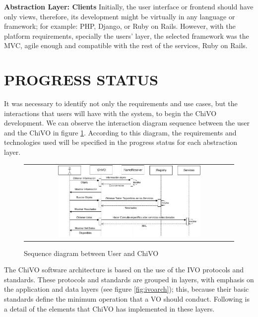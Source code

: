 \documentclass[]{spie}
\begin{document}
\textbf{Abstraction Layer:  Clients}
Initially, the user interface or frontend should have only views, therefore, its development might be virtually in any language or framework; for example: PHP, Django, or Ruby on Rails.  However, with the platform requirements, specially the users' layer, the selected framework was the MVC, agile enough and compatible with the rest of the services, Ruby on Rails.


\section{PROGRESS STATUS}
It was necessary to identify not only the requirements and use cases, but the interactions that users will have with the system, to begin the ChiVO development.  We can observe the interaction diagram sequence between the user and the ChiVO in figure \ref{fig:secuencia}.  According to this diagram, the requirements and technologies used will be specified in the progress status for each abstraction layer.

\begin{figure}
   \begin{center}
   \begin{tabular}{c}
   \includegraphics[width=0.7\textwidth]{images/secuencia.png}
   \end{tabular}
   \end{center}
   \caption[example]
   { \label{fig:secuencia} Sequence diagram between User and ChiVO}
\end{figure}

The ChiVO software architecture is based on the use of the IVO protocols and standards.  These protocols and standards are grouped in layers, with emphasis on the application and data layers (see figure \ref{fig:ivoarch}); this, because their basic standards define the minimum operation that a VO should conduct.  Following is a detail of the elements that ChiVO has implemented in these layers.
\end{document}
